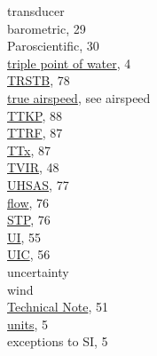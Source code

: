 \documentclass[
]{book}
\begin{document}
transducer\\
\hspace*{0.333em}\hspace*{0.333em}barometric, 29\\
\hspace*{0.333em}\hspace*{0.333em}Paroscientific, 30\\
\href{./1-introduction.html\#constants-and-symbols}{triple point of water}, 4\\
\href{./8-radiation-variables.html\#trstx}{TRSTB}, 78\\
\href{./4-the-state-of-the-atmosphere.html\#true-airspeed}{true airspeed}, see airspeed\\
\href{./10-obsolete-variables.html\#ttkp}{TTKP}, 88\\
\href{./10-obsolete-variables.html\#ttrf}{TTRF}, 87\\
\href{./10-obsolete-variables.html\#ttx}{TTx}, 87\\
\href{./4-the-state-of-the-atmosphere.html\#TVIR}{TVIR}, 48\\
\href{./5-cloud-physics-variables.html\#size-distribution}{UHSAS}, 77\\
\hspace*{0.333em}\hspace*{0.333em}\href{./7-aerosol-particle-measurements.html\#pflw}{flow}, 76\\
\hspace*{0.333em}\hspace*{0.333em}\href{./7-aerosol-particle-measurements.html\#pflw}{STP}, 76\\
\href{./4-the-state-of-the-atmosphere.html\#ui-vi-wi}{UI}, 55\\
\href{./4-the-state-of-the-atmosphere.html\#uic-vic}{UIC}, 56\\
uncertainty\\
\hspace*{0.333em}\hspace*{0.333em}wind\\
\hspace*{0.333em}\hspace*{0.333em}\hspace*{0.333em}\hspace*{0.333em}\href{./4-the-state-of-the-atmosphere.html\#wind}{Technical Note}, 51\\
\href{./2-general-information-about-data-files.html\#units-and-abbreviations}{units}, 5\\
\hspace*{0.333em}\hspace*{0.333em}exceptions to SI, 5\\
\end{document}
